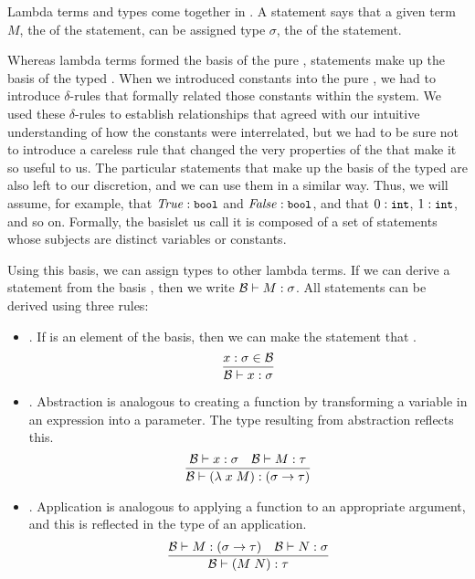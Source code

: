 Lambda terms and types come together in . A statement  says that a given term $M$, the  of the statement, can be assigned type $\sigma$, the  of the statement.

Whereas lambda terms formed the basis of the pure \lambdacalc{}, statements make up the basis of the typed \lambdacalc{}. When we introduced constants into the pure \lambdacalc{}, we had to introduce $\delta$-rules that formally related those constants within the system. We used these $\delta$-rules to establish relationships that agreed with our intuitive understanding of how the constants were interrelated, but we had to be sure not to introduce a careless rule that changed the very properties of the \lambdacalc that make it so useful to us. The particular statements that make up the basis of the typed \lambdacalc are also left to our discretion, and we can use them in a similar way. Thus, we will assume, for example, that  $\stmt[text]{\text{\const{True}}}{bool}$ and $\stmt[text]{\text{\const{False}}}{bool}$, and that $\stmt[text]{0}{int}$, $\stmt[text]{1}{int}$, and so on. Formally, the basis\empause let us call it \basis\empause is composed of a set of statements whose subjects are distinct variables or constants.

Using this basis, we can assign types to other lambda terms. If we can derive a statement  from the basis \basis, then we write $\basis \turnstile \stmt{M}{\sigma}$. All statements can be derived using three rules:
\begin{itemize}
\item {}. If  is an element of the basis, then we can make the statement that .
\[
    \frac{\stmt{x}{\sigma} \in \basis}{\basis \turnstile \stmt{x}{\sigma}}
\]

\item {}. Abstraction is analogous to creating a function by transforming a variable in an expression into a parameter. The type resulting from abstraction reflects this.
\[
    \frac{\basis \turnstile \stmt{x}{\sigma}\quad%
        \basis \turnstile \stmt{M}{\tau}}%
    {\basis \turnstile \stmt{(\lambda\; x\; M)}{(\sigma \to \tau)}}
\]

\item {}. Application is analogous to applying a function to an appropriate argument, and this is reflected in the type of an application.
\[
    \frac{\basis \turnstile \stmt{M}{(\sigma \to \tau)}\quad
        \basis \turnstile \stmt{N}{\sigma}}%
    {\basis \turnstile \stmt{(M\; N)}{\tau}}
\]
\end{itemize}

